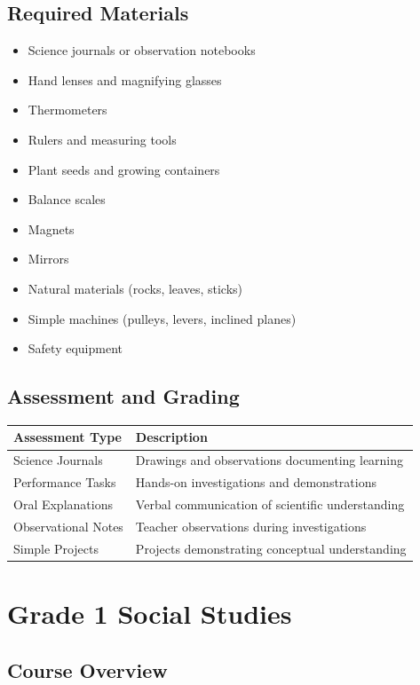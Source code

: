 \documentclass[11pt,letterpaper]{report}
\begin{document}
\section{Required Materials}

\begin{itemize}
\item Science journals or observation notebooks
\item Hand lenses and magnifying glasses
\item Thermometers
\item Rulers and measuring tools
\item Plant seeds and growing containers
\item Balance scales
\item Magnets
\item Mirrors
\item Natural materials (rocks, leaves, sticks)
\item Simple machines (pulleys, levers, inclined planes)
\item Safety equipment
\end{itemize}

\section{Assessment and Grading}

\begin{center}
\begin{tabular}{|l|l|}
\hline
\textbf{Assessment Type} & \textbf{Description} \\
\hline
Science Journals & Drawings and observations documenting learning \\
\hline
Performance Tasks & Hands-on investigations and demonstrations \\
\hline
Oral Explanations & Verbal communication of scientific understanding \\
\hline
Observational Notes & Teacher observations during investigations \\
\hline
Simple Projects & Projects demonstrating conceptual understanding \\
\hline
\end{tabular}
\end{center}

\chapter{Grade 1 Social Studies}

\section{Course Overview}
\end{document}
